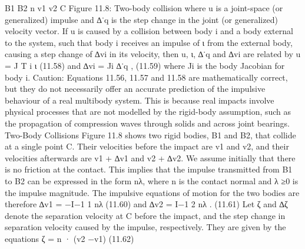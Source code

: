 B1 B2 n v1 v2 C Figure 11.8: Two-body collision where u is a joint-space (or generalized) impulse and ∆˙q is the step change in the joint (or generalized) velocity vector. If u is caused by a collision between body i and a body external to the system, such that body i receives an impulse of ι from the external body, causing a step change of ∆vi in its velocity, then u, ι, ∆˙q and ∆vi are related by u = J T i ι (11.58) and ∆vi = Ji ∆˙q , (11.59) where Ji is the body Jacobian for body i. Caution: Equations 11.56, 11.57 and 11.58 are mathematically correct, but they do not necessarily offer an accurate prediction of the impulsive behaviour of a real multibody system. This is because real impacts involve physical processes that are not modelled by the rigid-body assumption, such as the propagation of compression waves through solids and across joint bearings. Two-Body Collisions Figure 11.8 shows two rigid bodies, B1 and B2, that collide at a single point C. Their velocities before the impact are v1 and v2, and their velocities afterwards are v1 + ∆v1 and v2 + ∆v2. We assume initially that there is no friction at the contact. This implies that the impulse transmitted from B1 to B2 can be expressed in the form nλ, where n is the contact normal and λ ≥0 is the impulse magnitude. The impulsive equations of motion for the two bodies are therefore ∆v1 = −I−1 1 nλ (11.60) and ∆v2 = I−1 2 nλ . (11.61) Let ζ and ∆ζ denote the separation velocity at C before the impact, and the step change in separation velocity caused by the impulse, respectively. They are given by the equations ζ = n · (v2 −v1) (11.62)

